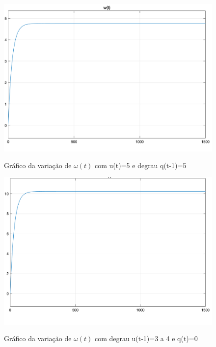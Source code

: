 \documentclass[11pt]{article}
\begin{document}
\begin{figure}[H]
	\centering
	{\includegraphics[width=\textwidth]
		{assets/q1_u(t)_3_q(t)_0to5.png}}
	\caption{Gráfico da variação de $\omega(t)$ com u(t)=5 e degrau q(t-1)=5}
\end{figure}

\begin{figure}[H]
	\centering
	{\includegraphics[width=\textwidth]
		{assets/q1_u(t)_3to4_q(t)_0.png}}
	\caption{ Gráfico da variação de $\omega(t)$ com degrau u(t-1)=3 a 4 e q(t)=0}
\end{figure}
\end{document}
